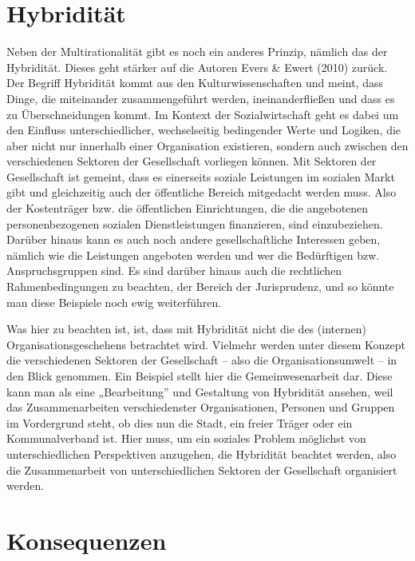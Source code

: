\documentclass[
  letterpaper,
]{book}
\begin{document}
\section{Hybridität}\label{hybriditaet}

Neben der Multirationalität gibt es noch ein anderes Prinzip, nämlich
das der Hybridität. Dieses geht stärker auf die Autoren Evers \& Ewert
(2010) zurück. Der Begriff Hybridität kommt aus den Kulturwissenschaften
und meint, dass Dinge, die miteinander zusammengeführt werden,
ineinanderfließen und dass es zu Überschneidungen kommt. Im Kontext der
Sozialwirtschaft geht es dabei um den Einfluss unterschiedlicher,
wechselseitig bedingender Werte und Logiken, die aber nicht nur
innerhalb einer Organisation existieren, sondern auch zwischen den
verschiedenen Sektoren der Gesellschaft vorliegen können. Mit Sektoren
der Gesellschaft ist gemeint, dass es einerseits soziale Leistungen im
sozialen Markt gibt und gleichzeitig auch der öffentliche Bereich
mitgedacht werden muss. Also der Kostenträger bzw. die öffentlichen
Einrichtungen, die die angebotenen personenbezogenen sozialen
Dienstleistungen finanzieren, sind einzubeziehen. Darüber hinaus kann es
auch noch andere gesellschaftliche Interessen geben, nämlich wie die
Leistungen angeboten werden und wer die Bedürftigen bzw.
Anspruchsgruppen sind. Es sind darüber hinaus auch die rechtlichen
Rahmenbedingungen zu beachten, der Bereich der Jurisprudenz, und so
könnte man diese Beispiele noch ewig weiterführen.

Was hier zu beachten ist, ist, dass mit Hybridität nicht die des
(internen) Organisationsgeschehens betrachtet wird. Vielmehr werden
unter diesem Konzept die verschiedenen Sektoren der Gesellschaft -- also
die Organisationsumwelt -- in den Blick genommen. Ein Beispiel stellt
hier die Gemeinwesenarbeit dar. Diese kann man als eine „Bearbeitung''
und Gestaltung von Hybridität ansehen, weil das Zusammenarbeiten
verschiedenster Organisationen, Personen und Gruppen im Vordergrund
steht, ob dies nun die Stadt, ein freier Träger oder ein Kommunalverband
ist. Hier muss, um ein soziales Problem möglichst von unterschiedlichen
Perspektiven anzugehen, die Hybridität beachtet werden, also die
Zusammenarbeit von unterschiedlichen Sektoren der Gesellschaft
organisiert werden.

\section{Konsequenzen}\label{sozialwirtschat-konsequenzen}
\end{document}
